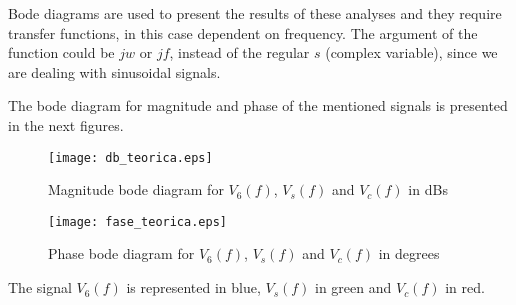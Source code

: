Bode diagrams are used to present the results of these analyses and they require transfer functions, in this case dependent on frequency. The argument of the function could be $jw$ or $jf$, instead of the regular $s$ (complex variable), since we are dealing with sinusoidal signals.

The bode diagram for magnitude and phase of the mentioned signals is presented in the next figures.

\begin{figure}[!ht]
  \centering
  \texttt{[image: db\_teorica.eps]}
  \caption{Magnitude bode diagram for $V_6(f)$, $V_s(f)$ and $V_c(f)$ in dBs}
  \label{bode1}
\end{figure}

\begin{figure}[!ht]
  \centering
  \texttt{[image: fase\_teorica.eps]}
  \caption{Phase bode diagram for $V_6(f)$, $V_s(f)$ and $V_c(f)$ in degrees}
  \label{bode2}
\end{figure}
\newpage

The signal $V_6(f)$ is represented in blue, $V_s(f)$ in green and $V_c(f)$ in red.



